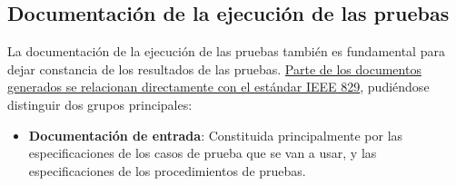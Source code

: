 \subsection{Documentación de la ejecución de las pruebas}

La documentación de la ejecución de las pruebas también es fundamental para dejar constancia de los resultados de las pruebas. \uline{Parte de los documentos generados se relacionan directamente con el estándar IEEE 829}, pudiéndose distinguir dos grupos principales:

\begin{itemize}
    \item \textbf{Documentación de entrada}: Constituida principalmente por las especificaciones de los casos de prueba que se van a usar, y las especificaciones de los procedimientos de pruebas.
    

\end{itemize}
